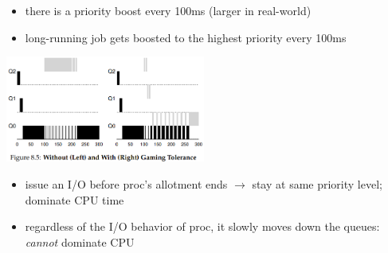 \begin{minipage}{.5\linewidth}
  \flushleft
  \begin{itemize}
  \item there is a priority boost every 100ms (larger in real-world)
  \item long-running job gets boosted to the highest priority every 100ms
  \end{itemize}
\end{minipage}
\includegraphics[width=\linewidth,height=3.5cm]{imgs/sched_g}
\begin{minipage}{.5\linewidth}
  \flushleft
  \begin{itemize}
  \item issue an I/O before proc's allotment ends $\to$ stay at same priority level; dominate CPU time
  \end{itemize}
\end{minipage}
\begin{minipage}{.5\linewidth}
  \flushleft
  \begin{itemize}
  \item regardless of the I/O behavior of proc, it slowly moves down the queues: \emph{cannot} dominate CPU
  \end{itemize}
\end{minipage}
